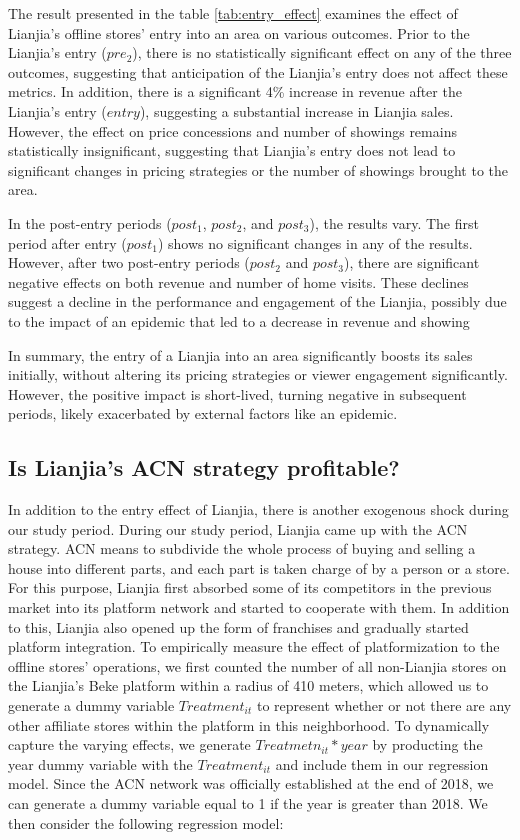 \documentclass[12pt]{article}
\begin{document}
The result presented in the table \ref{tab:entry_effect} examines the effect of Lianjia's offline stores' entry into an area on various outcomes. Prior to the Lianjia's entry ($pre_2$), there is no statistically significant effect on any of the three outcomes, suggesting that anticipation of the Lianjia's entry does not affect these metrics. In addition, there is a significant 4\% increase in revenue after the Lianjia's entry ($entry$), suggesting a substantial increase in Lianjia sales. However, the effect on price concessions and number of showings remains statistically insignificant, suggesting that Lianjia's entry does not lead to significant changes in pricing strategies or the number of showings brought to the area.

In the post-entry periods ($post_1$, $post_2$, and $post_3$), the results vary. The first period after entry ($post_1$) shows no significant changes in any of the results. However, after two post-entry periods ($post_2$ and $post_3$), there are significant negative effects on both revenue and number of home visits. These declines suggest a decline in the performance and engagement of the Lianjia, possibly due to the impact of an epidemic that led to a decrease in revenue and showing

In summary, the entry of a Lianjia into an area significantly boosts its sales initially, without altering its pricing strategies or viewer engagement significantly. However, the positive impact is short-lived, turning negative in subsequent periods, likely exacerbated by external factors like an epidemic.

\subsection{Is Lianjia's ACN strategy profitable?} \label{subsec:acn_strategy}

In addition to the entry effect of Lianjia, there is another exogenous shock during our study period. During our study period, Lianjia came up with the ACN strategy. ACN means to subdivide the whole process of buying and selling a house into different parts, and each part is taken charge of by a person or a store. For this purpose, Lianjia first absorbed some of its competitors in the previous market into its platform network and started to cooperate with them. In addition to this, Lianjia also opened up the form of franchises and gradually started platform integration. To empirically measure the effect of platformization to the offline stores' operations, we first counted the number of all non-Lianjia stores on the Lianjia's Beke platform within a radius of 410 meters, which allowed us to generate a dummy variable $Treatment_{it}$ to represent whether or not there are any other affiliate stores within the platform in this neighborhood. To dynamically capture the varying effects, we generate $Treatmetn_{it} * year$ by producting the year dummy variable with the $Treatment_{it}$ and include them in our regression model. Since the ACN network was officially established at the end of 2018, we can generate a dummy variable equal to 1 if the year is greater than 2018. We then consider the following regression model:
\end{document}

